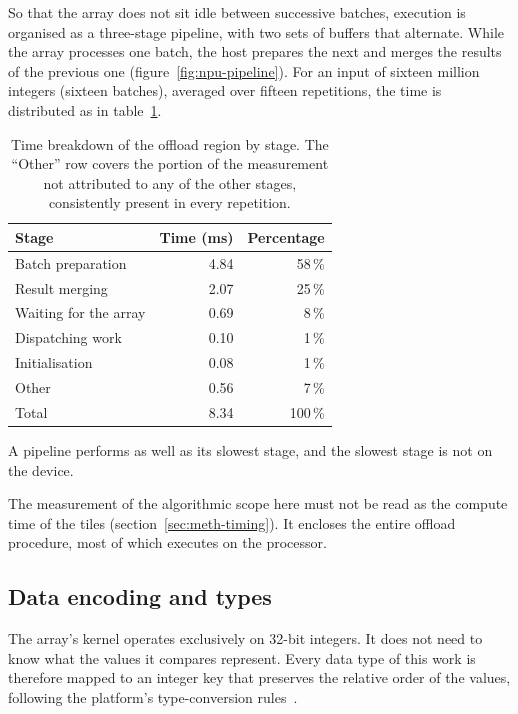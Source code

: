 So that the array does not sit idle between successive batches, execution is
organised as a three-stage pipeline, with two sets of buffers that alternate.
While the array processes one batch, the host prepares the next and merges the
results of the previous one (figure~\ref{fig:npu-pipeline}). For an input of
sixteen million integers (sixteen batches), averaged over fifteen repetitions,
the time is distributed as in table~\ref{tab:npu-phases}.

\begin{table}[H]
    \centering
    \begin{tabular}{lrr}
        \toprule
        Stage & Time (ms) & Percentage \\
        \midrule
        Batch preparation & 4.84 & 58\,\% \\
        Result merging & 2.07 & 25\,\% \\
        Waiting for the array & 0.69 & 8\,\% \\
        Dispatching work & 0.10 & 1\,\% \\
        Initialisation & 0.08 & 1\,\% \\
        Other & 0.56 & 7\,\% \\
        \midrule
        Total & 8.34 & 100\,\% \\
        \bottomrule
    \end{tabular}
    \caption[Time breakdown of the offload region by stage]{Time
    breakdown of the offload region by stage. The ``Other'' row covers
    the portion of the measurement not attributed to any of the other
    stages, consistently present in every repetition.}
    \label{tab:npu-phases}
\end{table}

A pipeline performs as well as its slowest stage, and the slowest stage is not
on the device.

The measurement of the algorithmic scope here must not be read as the compute
time of the tiles (section~\ref{sec:meth-timing}). It encloses the entire
offload procedure, most of which executes on the processor.



\subsection{Data encoding and types}
\label{sec:npu-encoding}

The array's kernel operates exclusively on 32-bit integers. It does not need to
know what the values it compares represent. Every data type of this work is
therefore mapped to an integer key that preserves the relative order of the
values, following the platform's type-conversion rules~\cite{amd2024ug1079}.


